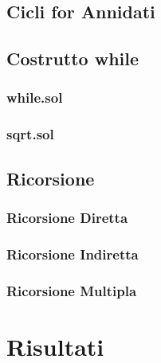     
    \subsection{Cicli for Annidati}

    \subsection{Costrutto while}
    
        \subsubsection{while.sol}

        \subsubsection{sqrt.sol}

    \subsection{Ricorsione}

        \subsubsection{Ricorsione Diretta}

        \subsubsection{Ricorsione Indiretta}
        
        \subsubsection{Ricorsione Multipla}
    
\section{Risultati}

